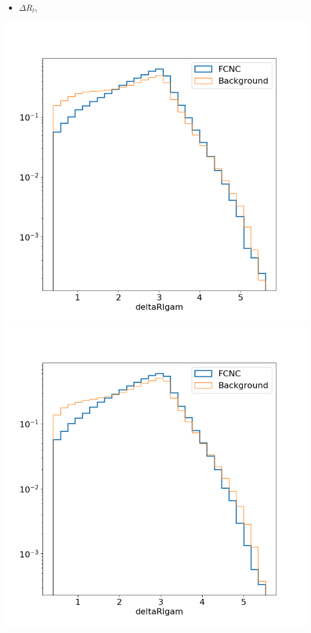 \documentclass[10pt]{beamer}
\begin{document}
{\begin{columns}
\begin{column}{0.33\textwidth}
\begin{itemize}
\item $\Delta R_{l\gamma}$
\end{itemize}
\includegraphics[width=.85\textwidth]{Images/ejetsvarplots/deltaRlgam.png} \\
\includegraphics[width=.85\textwidth]{Images/mujetsvarplots/deltaRlgam.png}
\end{column}
\end{columns}
}
\end{document}
